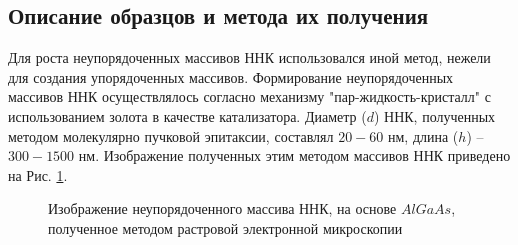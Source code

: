 \documentclass[a4paper,14pt,russian]{extreport}
\begin{document}
			\subsection{Описание образцов и метода их получения}\label{DescriptionOfDesordered}
				Для роста неупорядоченных массивов ННК использовался иной метод, нежели для создания упорядоченных массивов. Формирование неупорядоченных массивов ННК осуществлялось согласно механизму "пар-жидкость-кристалл" с использованием золота в качестве катализатора. Диаметр ($d$) ННК, полученных методом молекулярно пучковой эпитаксии, составлял $20-60$ нм, длина ($h$) – $300-1500$ нм. Изображение полученных этим методом массивов ННК приведено на Рис. \ref{ris:desordrered}.
				\begin{figure}[H]
					\caption{Изображение неупорядоченного массива ННК, на основе $AlGaAs$, полученное методом растровой электронной микроскопии}
				\label{ris:desordrered}
				\end{figure}
\end{document}
